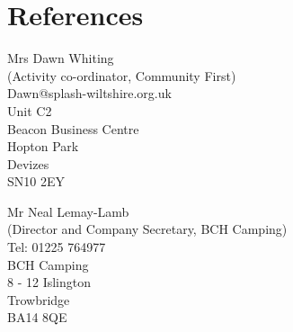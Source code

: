 \section*{References}
\begin{minipage}{0.5\linewidth}
Mrs Dawn Whiting\\
(Activity co-ordinator, Community First)\\
Dawn@splash-wiltshire.org.uk\\
Unit C2\\
Beacon Business Centre\\
Hopton Park\\
Devizes\\
SN10 2EY\\
\end{minipage}
\begin{minipage}{0.5\linewidth}
Mr Neal Lemay-Lamb\\
(Director and Company Secretary, BCH Camping)\\
Tel: 01225 764977\\
BCH Camping\\
8 - 12 Islington\\
Trowbridge\\
BA14 8QE
\end{minipage}